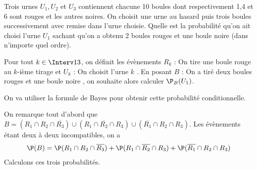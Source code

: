 \documentclass[a4paper,10pt]{report}
\begin{document}
\begin{Exa} Trois urnes $U_1, U_2 $ et $U_3$ contiennent chacune 10 boules dont respectivement 1,4 et 6 sont rouges et les autres noires. On choisit une urne au hasard puis trois boules successivement avec remise dans l'urne choisie. Quelle est la probabilité qu'on ait choisi l'urne $U_1$ sachant qu'on a obtenu 2 boules rouges et une boule noire (dans n'importe quel ordre).
\end{Exa}

\corr Pour tout $k \in \Interv13$, on définit les évènements $R_k$ : \og On tire une boule rouge au $k$-ième tirage \fg et $U_k$ : \og On choisit l'urne $k$ \fg . En posant $B$ : \og On a tiré deux boules rouges et une boule noire \fg , on souhaite  alors calculer $\P_B(U_1)$.

\vspace{0.2cm}

\noindent On va utiliser la formule de Bayes pour obtenir cette probabilité conditionnelle.

\vspace{0.2cm}

\noindent On remarque tout d'abord que $B = (R_1 \cap R_2 \cap \overline{R_3}) \cup (R_1 \cap \overline{R_2} \cap R_3) \cup (\overline{R_1} \cap R_2 \cap R_3)$. Les évènements étant deux à deux incompatibles, on a 
\[ \P(B) = \P( R_1 \cap R_2 \cap \overline{R_3}) + \P(R_1 \cap \overline{R_2} \cap R_3) + \P(\overline{R_1} \cap R_2 \cap R_3) \]
\noindent Calculons ces trois probabilités.
\end{document}
